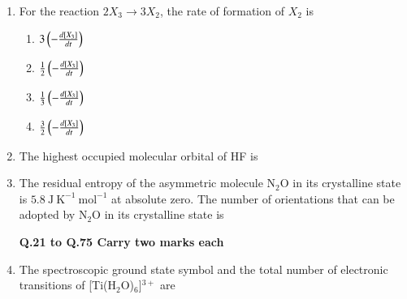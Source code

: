 \documentclass[12pt]{article}
\begin{document}
\begin{enumerate}
    

    \item For the reaction $2 X_3 \rightarrow 3 X_2$, the rate of formation of $X_2$ is
\begin{enumerate}

\item $3 \left(-\frac{d[X_3]}{dt}\right)$
\item $\frac{1}{2} \left(-\frac{d[X_3]}{dt}\right)$
\item $\frac{1}{3} \left(-\frac{d[X_3]}{dt}\right)$
\item $\frac{3}{2} \left(-\frac{d[X_3]}{dt}\right)$  \hfill{}
\end{enumerate}



\item The highest occupied molecular orbital of HF is
\begin{enumerate}
\end{enumerate}


   \item  The residual entropy of the asymmetric molecule N$_2$O in its crystalline state is $5.8\ \mathrm{J\ K^{-1}\ mol^{-1}}$ at absolute zero. The number of orientations that can be adopted by N$_2$O in its crystalline state is \begin{enumerate}
\hfill{} 
\end{enumerate}


\textbf{Q.21 to Q.75 Carry two marks each}


\item The spectroscopic ground state symbol and the total number of electronic transitions of [Ti(H$_2$O)$_6$]$^{3+}$ are
\begin{enumerate}
\end{enumerate}



\end{enumerate}
\end{document}
